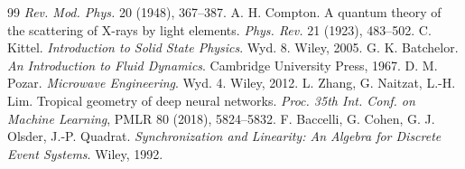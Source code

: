 \documentclass[11pt,a4paper]{article}
\begin{document}
{\begin{thebibliography}{99}
\emph{Rev. Mod. Phys.} 20 (1948), 367--387.
 A. H. Compton.
A quantum theory of the scattering of X-rays by light elements.
\emph{Phys. Rev.} 21 (1923), 483--502.
 C. Kittel.
\emph{Introduction to Solid State Physics}. Wyd. 8. Wiley, 2005.
 G. K. Batchelor.
\emph{An Introduction to Fluid Dynamics}. Cambridge University Press, 1967.
 D. M. Pozar.
\emph{Microwave Engineering}. Wyd. 4. Wiley, 2012.
 L. Zhang, G. Naitzat, L.-H. Lim.
Tropical geometry of deep neural networks.
\emph{Proc. 35th Int. Conf. on Machine Learning}, PMLR 80 (2018), 5824--5832.
 F. Baccelli, G. Cohen, G. J. Olsder, J.-P. Quadrat.
\emph{Synchronization and Linearity: An Algebra for Discrete Event Systems}.
Wiley, 1992.
\end{thebibliography}
}
\end{document}
